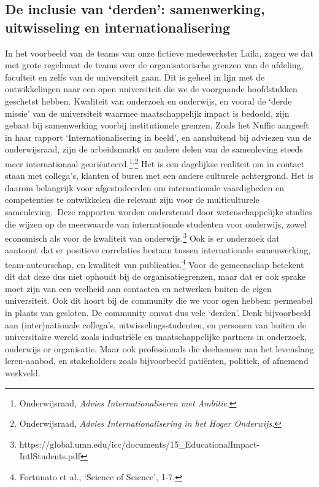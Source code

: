 \documentclass[smallauthor, chapterhaspagenum, nochapterinheader, pagenuminheader,  bigchapnum,medium2, tocpages, garamond, titleinheader]{jote-book}
\begin{document}
	\subsection{De inclusie van ‘derden': samenwerking, uitwisseling en internationalisering}



	In het voorbeeld van de teams van onze fictieve medewerkster Laila, zagen we dat met grote regelmaat de teams over de organisatorische grenzen van de afdeling, faculteit en zelfs van de universiteit gaan. Dit is geheel in lijn met de ontwikkelingen naar een open universiteit die we de voorgaande hoofdstukken geschetst hebben. Kwaliteit van onderzoek en onderwijs, en vooral de ‘derde missie' van de universiteit waarmee maatschappelijk impact is bedoeld, zijn gebaat bij samenwerking voorbij institutionele grenzen. Zoals het Nuffic aangeeft in haar rapport ‘Internationalisering in beeld', en aansluitend bij adviezen van de onderwijsraad, zijn de arbeidsmarkt en andere delen van de samenleving steeds meer internationaal georiënteerd.\footnote{\emph{ }Onderwijsraad, \emph{Advies}\emph{ }\emph{Internationaliseren met Ambitie}. }\textsuperscript{,}\footnote{Onderwijsraad, \emph{Advies Internationalisering in het Hoger Onderwijs}.} Het is een dagelijkse realiteit om in contact staan met collega's, klanten of buren met een andere culturele achtergrond. Het is daarom belangrijk voor afgestudeerden om internationale vaardigheden en competenties te ontwikkelen die relevant zijn voor de multiculturele samenleving. Deze rapporten worden ondersteund door wetenschappelijke studies die wijzen op de meerwaarde van internationale studenten voor onderwijs, zowel economisch als voor de kwaliteit van onderwijs.\footnote{https://global.umn.edu/icc/documents/15\_EducationalImpact-IntlStudents.pdf} Ook is er onderzoek dat aantoont dat er positieve correlaties bestaan tussen internationale samenwerking, team-auteurschap, en kwaliteit van publicaties.\footnote{Fortunato et al., ‘Science of Science', 1-7. } Voor de gemeenschap betekent dit dat deze dus niet ophoudt bij de organisatiegrenzen, maar dat er ook sprake moet zijn van een veelheid aan contacten en netwerken buiten de eigen universiteit. Ook dit hoort bij de community die we voor ogen hebben: permeabel in plaats van gesloten. De community omvat dus vele ‘derden'. Denk bijvoorbeeld aan (inter)nationale collega's, uitwisselingsstudenten, en personen van buiten de universitaire wereld zoals industriële en maatschappelijke partners in onderzoek, onderwijs or organisatie. Maar ook professionals die deelnemen aan het levenslang leren-aanbod, en stakeholders zoals bijvoorbeeld patiënten, politiek, of afnemend werkveld.
\end{document}
